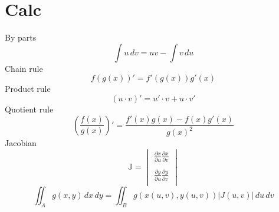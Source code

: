 \documentclass[twocolumn]{amsart}
\begin{document}
\section*{Calc}
By parts
\begin{equation*}
  \int u\,dv = uv-\int v\,du
\end{equation*}
Chain rule
\begin{equation*}
  f(g(x))' = f'(g(x))g'(x)
\end{equation*}
Product rule
\begin{equation*}
  (u \cdot v)' = u' \cdot v + u \cdot v'
\end{equation*}
Quotient rule
\begin{equation*}
  (\frac{f(x)}{g(x)})' = \frac{f'(x)g(x) - f(x)g'(x)}{g(x)^2}
\end{equation*}
Jacobian
\begin{equation*}
\mathbb{J}=\begin{vmatrix}
\frac{\partial x}{\partial u}\frac{\partial x}{\partial v} \\
\\
\frac{\partial y}{\partial u}\frac{\partial y}{\partial v} \\
\end{vmatrix}
\end{equation*}
\begin{equation*}
  \iint_{A}g(x,y)\,dx\,dy = \iint_{B}g(x(u,v),y(u,v))|J(u,v)|\,du\,dv
\end{equation*}
\end{document}
